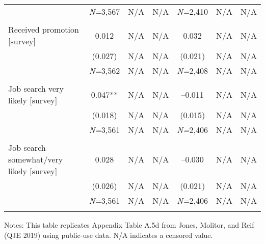 \documentclass{article}
\begin{document}
\begin{table}[tbp]
{\begin{tabularx}{\linewidth}{lCCCCCC}
&\textit{N=}3,567&N/A&N/A&\textit{N=}2,410&N/A&N/A \tabularnewline
&&&&&& \tabularnewline
Received promotion [survey]&0.012&N/A&N/A&0.032&N/A&N/A \tabularnewline
&(0.027)&N/A&N/A&(0.021)&N/A&N/A \tabularnewline
&\textit{N=}3,562&N/A&N/A&\textit{N=}2,408&N/A&N/A \tabularnewline
&&&&&& \tabularnewline
Job search very likely [survey]&0.047**&N/A&N/A&--0.011&N/A&N/A \tabularnewline
&(0.018)&N/A&N/A&(0.015)&N/A&N/A \tabularnewline
&\textit{N=}3,561&N/A&N/A&\textit{N=}2,406&N/A&N/A \tabularnewline
&&&&&& \tabularnewline
Job search somewhat/very likely [survey]&0.028&N/A&N/A&--0.030&N/A&N/A \tabularnewline
&(0.026)&N/A&N/A&(0.021)&N/A&N/A \tabularnewline
&\textit{N=}3,561&N/A&N/A&\textit{N=}2,406&N/A&N/A \tabularnewline
\bottomrule\addlinespace[-1.5ex] 

\end{tabularx}
\begin{flushleft}
\footnotesize Notes: This table replicates Appendix Table A.5d from Jones, Molitor, and Reif (QJE 2019) using public-use data. N/A indicates a censored value.
\end{flushleft}
}
\end{table}
\end{document}

